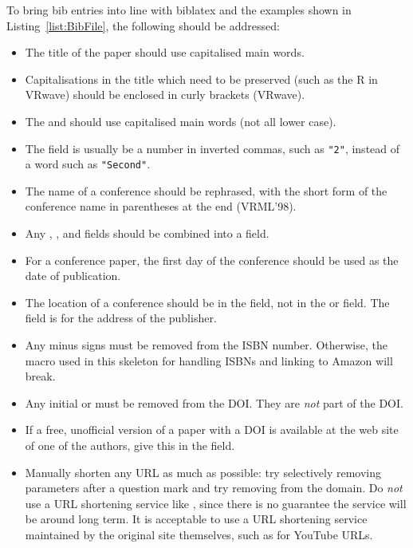 To bring bib entries into line with biblatex and the examples shown in
Listing~\ref{list:BibFile}, the following should be addressed:
\begin{itemize}
\item The title of the paper should use capitalised main words.

\item Capitalisations in the title which need to be preserved (such as
  the R in VRwave) should be enclosed in curly brackets ({VRwave}).

\item The  and  should use
  capitalised main words (not all lower case).

\item The  field is usually be a number in inverted
  commas, such as \verb|"2"|, instead of a word such as
  \verb|"Second"|.

\item The name of a conference should be rephrased, with the short
  form of the conference name in parentheses at the end (VRML'98).

\item Any , , and 
  fields should be combined into a  field.

\item For a conference paper, the first day of the conference
  should be used as the date of publication.

\item The location of a conference should be in the 
  field, not in the  or  field.
  The  field is for the address of the publisher.


\item Any minus signs must be removed from the ISBN number.
  Otherwise, the macro used in this skeleton for handling ISBNs and
  linking to Amazon will break.

\item Any initial  or
   must be removed from
  the DOI. They are \emph{not} part of the DOI.

\item If a free, unofficial version of a paper with a DOI is available
  at the web site of one of the authors, give this in the 
  field.

\item Manually shorten any URL as much as possible: try selectively
  removing parameters after a question mark and try removing
   from the domain. Do \emph{not} use a URL shortening
  service like , since there is no guarantee the
  service will be around long term. It is acceptable to use a URL
  shortening service maintained by the original site themselves, such
  as  for YouTube URLs.

\end{itemize}






